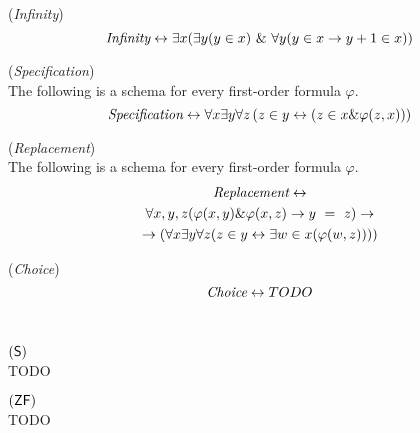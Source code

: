 \begin{definition}{(\emph{Infinity})}\label{def:infinity}\\
\begin{equation}
\emph{Infinity} \iff \exists x (\exists y (y \in x)\ \&\ \forall y(y \in x \then y+1 \in x))
\end{equation}
\end{definition}

\begin{definition}{(\emph{Specification})}\label{def:specification}\\
The following is a schema for every first-order formula $\varphi$.
\begin{equation}
\emph{Specification} \iff \forall x \exists y \forall z \, ( z \in y \iff ( z \in x \& \varphi(z, x)))
\end{equation}
\end{definition}

\begin{definition}{(\emph{Replacement})}\label{def:replacement}\\
The following is a schema for every first-order formula $\varphi$.
\begin{equation}
\begin{gathered}
\emph{Replacement} \iff\\
\forall x, y, z (\varphi(x, y) \& \varphi(x, z) \then y\ =\ z) \then \\
\then (\forall x \exists y \forall z (z \in y \iff \exists w \in x (\varphi(w, z))))
\end{gathered}
\end{equation}
\end{definition}

\begin{definition}{(\emph{Choice})}\label{def:choice}\\
\begin{equation}
\emph{Choice} \iff TODO
\end{equation}
\end{definition}

\

\begin{definition}{$(\sf{S})$}\label{def:s}\\
TODO
\end{definition}

\begin{definition}{$(\sf{ZF})$}\label{def:zf}\\
TODO
\end{definition}

